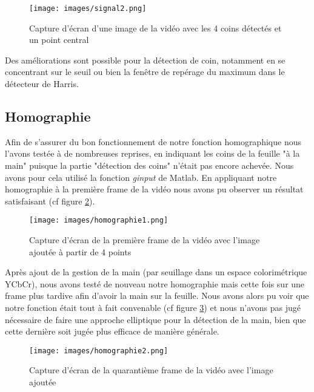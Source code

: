 \documentclass[blue]{ceri/sty/rapport}
\begin{document}
\begin{figure}[H]
\centering
\texttt{[image: images/signal2.png]}
\caption[coin2]{Capture d'écran d'une image de la vidéo avec les 4 coins détectés et un point central}
\label{fig:coin2}
\end{figure}

Des améliorations sont possible pour la détection de coin, notamment en se concentrant sur le seuil ou bien la fenêtre de repérage du maximum dans le détecteur de Harris.

\subsection{Homographie}

Afin de s'assurer du bon fonctionnement de notre fonction homographique nous l'avons testée à de nombreuses reprises, en indiquant les coins de la feuille "à la main" puisque la partie "détection des coins" n'était pas encore achevée. Nous avons pour cela utilisé la fonction \textit{ginput} de Matlab. En appliquant notre homographie à la première frame de la vidéo nous avons pu observer un résultat satisfaisant (cf figure \ref{fig:homographie1}).

\begin{figure}[H]
\centering
\texttt{[image: images/homographie1.png]}
\caption[homographie1]{Capture d'écran de la première frame de la vidéo avec l'image ajoutée à partir de 4 points}
\label{fig:homographie1}
\end{figure}

Après ajout de la gestion de la main (par seuillage dans un espace colorimétrique YCbCr), nous avons testé de nouveau notre homographie mais cette fois sur une frame plus tardive afin d'avoir la main sur la feuille. Nous avons alors pu voir que notre fonction était tout à fait convenable (cf figure \ref{fig:homographie2}) et nous n'avons pas jugé nécessaire de faire une approche elliptique pour la détection de la main, bien que cette dernière soit jugée plus efficace de manière générale.

\begin{figure}[H]
\centering
\texttt{[image: images/homographie2.png]}
\caption[homographie2]{Capture d'écran de la quarantième frame de la vidéo avec l'image ajoutée}
\label{fig:homographie2}
\end{figure}
\end{document}

